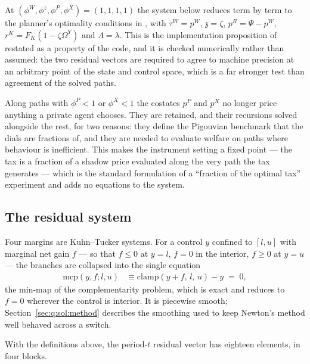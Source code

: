 \begin{remark}\label{rem:q:nesting}
At $\left(\phi^W,\phi^z,\phi^P,\phi^X\right)=\left(1,1,1,1\right)$ the system below reduces term by term to the planner's optimality conditions in , with $\tau^W=p^W$, $\mathfrak z=\zeta$, $p^R=\Psi-p^W$, $r^K=F_K\left(1-\zeta\Omega^Y\right)$ and $\Lambda=\lambda$. This is the implementation proposition of  restated as a property of the code, and it is checked numerically rather than assumed: the two residual vectors are required to agree to machine precision at an arbitrary point of the state and control space, which is a far stronger test than agreement of the solved paths.
\end{remark}

Along paths with $\phi^P<1$ or $\phi^X<1$ the costates $p^P$ and $p^X$ no longer price anything a private agent chooses. They are retained, and their recursions solved alongside the rest, for two reasons: they define the Pigouvian benchmark that the dials are fractions of, and they are needed to evaluate welfare on paths where behaviour is inefficient. This makes the instrument setting a fixed point --- the tax is a fraction of a shadow price evaluated along the very path the tax generates --- which is the standard formulation of a ``fraction of the optimal tax'' experiment and adds no equations to the system.

\subsection{The residual system}\label{sec:q:model:residuals}

 Four margins are Kuhn--Tucker systems. For a control $y$ confined to $\left[l,u\right]$ with marginal net gain $f$ --- so that $f\le0$ at $y=l$, $f=0$ in the interior, $f\ge0$ at $y=u$ --- the branches are collapsed into the single equation
\begin{align}
\mathrm{mcp}\left(y,f;l,u\right) &\equiv \mathrm{clamp}\left(y+f,\,l,\,u\right)-y \;=\;0 ,
\label{eq:q:mcp}
\end{align}
the min-map of the complementarity problem, which is exact and reduces to $f=0$ wherever the control is interior. It is piecewise smooth; Section~\ref{sec:q:sol:method} describes the smoothing used to keep Newton's method well behaved across a switch.

 With the definitions above, the period-$t$ residual vector has eighteen elements, in four blocks.

